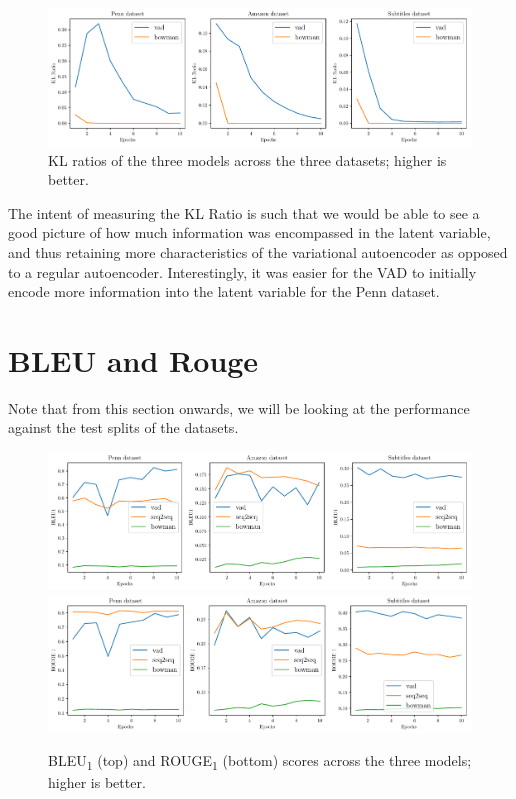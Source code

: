 \documentclass[12pt,twoside]{report}
\begin{document}
\begin{figure}[!ht]
	\centering
	\includegraphics[width=150mm]{results/kl_ratio.pdf}
	\caption{KL ratios of the three models across the three datasets; higher is better.\label{r:kl_ratio}}
  \end{figure}

The intent of measuring the KL Ratio is such that we would be able to see a good picture of how much information was encompassed in the latent variable, and thus retaining more characteristics of the variational autoencoder as opposed to a regular autoencoder. Interestingly, it was easier for the VAD to initially encode more information into the latent variable for the Penn dataset.


\section{BLEU and Rouge}

Note that from this section onwards, we will be looking at the performance against the test splits of the datasets. 

\begin{figure}[!ht]
	\centering
	\includegraphics[width=150mm]{results/bleu1.pdf}
	\includegraphics[width=150mm]{results/rouge_1.pdf}
	\caption{BLEU\textsubscript{1} (top) and ROUGE\textsubscript{1} (bottom) scores across the three models; higher is better.\label{r:bleu_rouge}}
  \end{figure}
\end{document}
